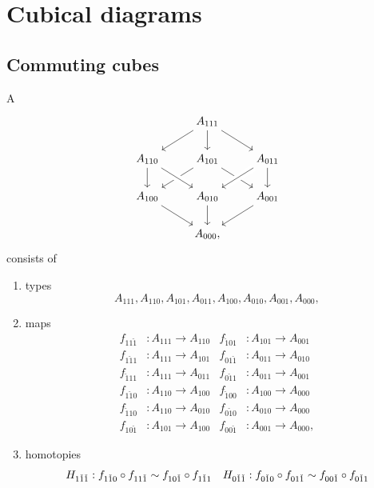 \chapter{Cubical diagrams}

\section{Commuting cubes}
\begin{defn}\label{defn:cube}
A 
\begin{equation*}
\begin{tikzcd}
& A_{111} \arrow[dl] \arrow[dr] \arrow[d] \\
A_{110} \arrow[d] & A_{101} \arrow[dl] \arrow[dr] & A_{011} \arrow[dl,crossing over] \arrow[d] \\
A_{100} \arrow[dr] & A_{010} \arrow[d] \arrow[from=ul,crossing over] & A_{001} \arrow[dl] \\
& A_{000},
\end{tikzcd}
\end{equation*}
consists of 
\begin{enumerate}
\item types
\begin{equation*}
A_{111},A_{110},A_{101},A_{011},A_{100},A_{010},A_{001},A_{000},
\end{equation*}
\item \begin{samepage}%
maps
\begin{align*}
f_{11\check{1}} & : A_{111}\to A_{110} & f_{\check{1}01} & : A_{101}\to A_{001} \\
f_{1\check{1}1} & : A_{111}\to A_{101} & f_{01\check{1}} & : A_{011}\to A_{010} \\
f_{\check{1}11} & : A_{111}\to A_{011} & f_{0\check{1}1} & : A_{011}\to A_{001} \\
f_{1\check{1}0} & : A_{110}\to A_{100} & f_{\check{1}00} & : A_{100}\to A_{000} \\
f_{\check{1}10} & : A_{110}\to A_{010} & f_{0\check{1}0} & : A_{010}\to A_{000} \\
f_{10\check{1}} & : A_{101}\to A_{100} & f_{00\check{1}} & : A_{001}\to A_{000},
\end{align*}
\end{samepage}%
\item homotopies
\begin{align*}
H_{1\check{1}\check{1}} & : f_{1\check{1}0}\circ f_{11\check{1}} \htpy f_{10\check{1}}\circ f_{1\check{1}1} & H_{0\check{1}\check{1}} & : f_{0\check{1}0}\circ f_{01\check{1}} \htpy f_{00\check{1}}\circ f_{0\check{1}1} \\

\end{align*}
\end{enumerate}
\end{defn}
